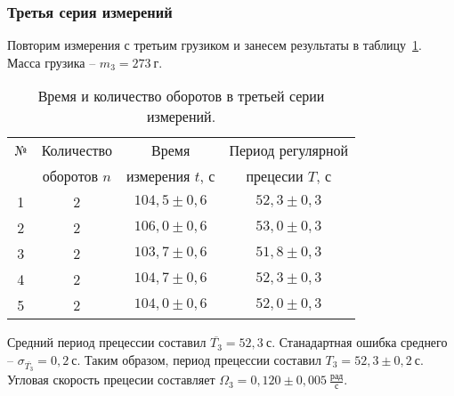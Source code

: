 \documentclass[a4paper,11pt]{article}
\begin{document}
\subsubsection{Третья серия измерений} %
Повторим измерения с третьим грузиком и занесем результаты в таблицу~\ref{table:tab3}.\newline
Масса грузика -- $m_{3} = 273\ г$.
\begin{table}[h!]
\centering
\begin{tabular}{ ||c|c|c|c|| }
  \hline
  № & Количество & Время & Период регулярной \\
   & оборотов $n$ & измерения $t$, $с$ & прецесии $T$, $с$ \\
  \hline
  1 & 2 & $104,5 \pm 0,6$ & $52,3 \pm 0,3$ \\
  2 & 2 & $106,0 \pm 0,6$ & $53,0 \pm 0,3$ \\
  3 & 2 & $103,7 \pm 0,6$ & $51,8 \pm 0,3$ \\
  4 & 2 & $104,7 \pm 0,6$ & $52,3 \pm 0,3$ \\
  5 & 2 & $104,0 \pm 0,6$ & $52,0 \pm 0,3$ \\
  \hline
\end{tabular}
\caption{Время и количество оборотов в третьей серии измерений.}
\label{table:tab3}
\end{table}\newline
Средний период прецессии составил $\overline{T_{3}} = 52,3\ с$.\newline
Станадартная ошибка среднего -- $\sigma_{\overline{T_{3}}}= 0,2\ с$.\newline
Таким образом, период прецессии составил $T_{3} = 52,3 \pm 0,2\ с$.\newline
Угловая скорость прецесии составляет $\Omega_{3} = 0,120 \pm 0,005\ \frac{рад}{с}$.
\end{document}
